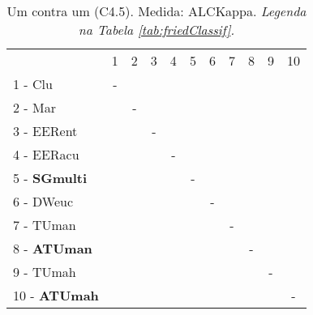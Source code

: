 \begin{table}[h]
\caption{Um contra um (C4.5). Medida: ALCKappa. \textit{Legenda na Tabela \ref{tab:friedClassif}.}}
\begin{center}\begin{tabular}{lcc|cc|cc|cc|cc}
 			& 1 & 2 & 3 & 4 & 5 & 6 & 7 & 8 & 9 & 10\\
1 - Clu  	& - &   &   &   &   &   &   &   &   &   \\
2 - Mar  	&   & - &   &   &   &   &   &   &   &   \\ \hline
3 - EERent	&   &   & - &   &   &   &   &   &   &   \\
4 - EERacu	&   &   &   & - &   &   &   &   &   &   \\ \hline
5 - \textbf{SGmulti}	&   &   &   &   & - &   &   &   &   &   \\
6 - DWeuc	&   &   &   &   &   & - &   &   &   &   \\ \hline
7 - TUman	&   &   &   &   &   &   & - &   &   &   \\
8 - \textbf{ATUman}	&   &   &   &   &   &   &   & - &   &   \\ \hline
9 - TUmah	&   &   &   &   &   &   &   &   & - &   \\
10 - \textbf{ATUmah}	&   &   &   &   &   &   &   &   &   & - \\ \hline\end{tabular}
\label{stratsALCKappaFriedC4.5RiscoRedux}
\end{center}
\end{table}